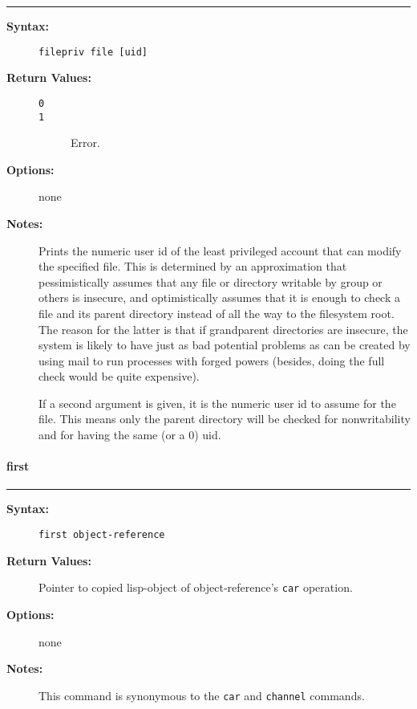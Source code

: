 \hrule
\begin{description}
\item[{\bf Syntax:}] \mbox{}

{\tt filepriv file [uid]}

\item[{\bf Return Values:}] \mbox{}

\begin{description}
\item[{\tt 0}] \mbox{}



\item[{\tt 1}] \mbox{}

Error.

\end{description}


\item[{\bf Options:}] \mbox{}

none

\item[{\bf Notes:}] \mbox{}

Prints the numeric user id of the least 
privileged account that can modify the specified file. This is 
determined by an approximation that pessimistically assumes that 
any file or directory writable by group or others is insecure, 
and optimistically assumes that it is enough to check a file and 
its parent directory instead of all the way to the filesystem root. 
The reason for the latter is that if grandparent directories are 
insecure, the system is likely to have just as bad potential 
problems as can be created by using mail to run processes with
forged powers (besides, doing the full check would be quite expensive).

If a second argument is given, it is the numeric user id to assume 
for the file. This means only the parent directory will be checked 
for nonwritability and for having the same (or a 0) uid.

\end{description}


\vspace {2pt}


\paragraph{first}

\hrule
\begin{description}
\item[{\bf Syntax:}] \mbox{}

{\tt first object-reference}

\item[{\bf Return Values:}] \mbox{}

Pointer to copied lisp-object of 
object-reference's {\tt car} operation.

\item[{\bf Options:}] \mbox{}

none  

\item[{\bf Notes:}] \mbox{}

This command is synonymous to the {\tt car} 
and {\tt channel} commands.  

\end{description}


